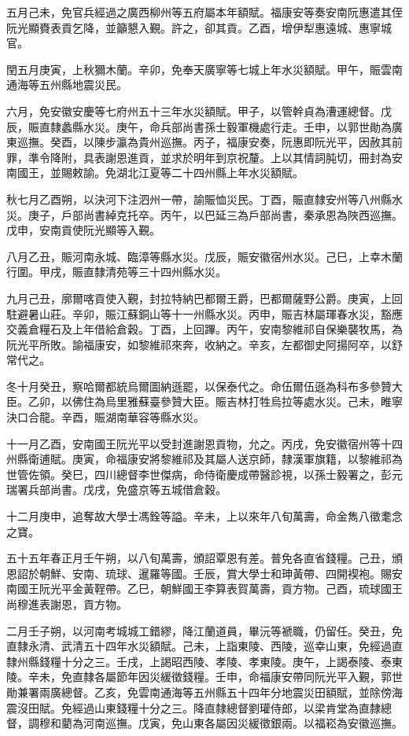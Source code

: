 \begin{pinyinscope}
五月己未，免官兵經過之廣西柳州等五府屬本年額賦。福康安等奏安南阮惠遣其侄阮光顯賚表貢乞降，並籲懇入覲。許之，卻其貢。乙酉，增伊犁惠遠城、惠寧城官。

閏五月庚寅，上秋獮木蘭。辛卯，免奉天廣寧等七城上年水災額賦。甲午，賑雲南通海等五州縣地震災民。

六月，免安徽安慶等七府州五十三年水災額賦。甲子，以管幹貞為漕運總督。戊辰，賑直隸蠡縣水災。庚午，命兵部尚書孫士毅軍機處行走。壬申，以郭世勛為廣東巡撫。癸酉，以陳步瀛為貴州巡撫。丙子，福康安奏，阮惠即阮光平，因赦其前罪，準令降附，具表謝恩進貢，並求於明年到京祝釐。上以其情詞肫切，冊封為安南國王，並賜敕諭。免湖北江夏等二十四州縣上年水災額賦。

秋七月乙酉朔，以決河下注泗州一帶，諭賑恤災民。丁酉，賑直隸安州等八州縣水災。庚子，戶部尚書綽克托卒。丙午，以巴延三為戶部尚書，秦承恩為陜西巡撫。戊申，安南貢使阮光顯等入覲。

八月乙丑，賑河南永城、臨漳等縣水災。戊辰，賑安徽宿州水災。己巳，上幸木蘭行圍。甲戌，賑直隸清苑等三十四州縣水災。

九月己丑，廓爾喀貢使入覲，封拉特納巴都爾王爵，巴都爾薩野公爵。庚寅，上回駐避暑山莊。辛卯，賑江蘇銅山等十一州縣水災。丙申，賑吉林屬琿春水災，豁應交義倉糧石及上年借給倉穀。丁酉，上回蹕。丙午，安南黎維祁自保樂襲牧馬，為阮光平所敗。諭福康安，如黎維祁來奔，收納之。辛亥，左都御史阿揚阿卒，以舒常代之。

冬十月癸丑，察哈爾都統烏爾圖納遜罷，以保泰代之。命伍爾伍遜為科布多參贊大臣。乙卯，以佛住為烏里雅蘇臺參贊大臣。賑吉林打牲烏拉等處水災。己未，睢寧決口合龍。辛酉，賑湖南華容等縣水災。

十一月乙酉，安南國王阮光平以受封進謝恩貢物，允之。丙戌，免安徽宿州等十四州縣衛逋賦。庚寅，命福康安將黎維祁及其屬人送京師，隸漢軍旗籍，以黎維祁為世管佐領。癸巳，四川總督李世傑病，命侍衛慶成帶醫診視，以孫士毅署之，彭元瑞署兵部尚書。戊戌，免盛京等五城借倉穀。

十二月庚申，追奪故大學士馮銓等謚。辛未，上以來年八旬萬壽，命金雋八徵耄念之寶。

五十五年春正月壬午朔，以八旬萬壽，頒詔覃恩有差。普免各直省錢糧。己丑，頒恩詔於朝鮮、安南、琉球、暹羅等國。壬辰，賞大學士和珅黃帶、四開褉袍。賜安南國王阮光平金黃鞓帶。乙巳，朝鮮國王李算表賀萬壽，貢方物。己酉，琉球國王尚穆進表謝恩，貢方物。

二月壬子朔，以河南考城城工錯繆，降江蘭道員，畢沅等褫職，仍留任。癸丑，免直隸永清、武清五十四年水災額賦。己未，上詣東陵、西陵，巡幸山東，免經過直隸州縣錢糧十分之三。壬戌，上謁昭西陵、孝陵、孝東陵。庚午，上謁泰陵、泰東陵。辛未，免直隸各屬節年因災緩徵錢糧。壬申，命福康安帶同阮光平入覲，郭世勛兼署兩廣總督。乙亥，免雲南通海等五州縣五十四年分地震災田額賦，並除傍海震沒田賦。免經過山東錢糧十分之三。降直隸總督劉瓘侍郎，以梁肯堂為直隸總督，調穆和藺為河南巡撫。戊寅，免山東各屬因災緩徵銀兩。以福崧為安徽巡撫。


\end{pinyinscope}
